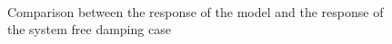 \begin{figure}[!ht]
	\ContinuedFloat
	\centering
		\\
	\caption{Comparison between the response of the model and the response of the 
	system free damping case}
	\label{fig:freedampingcase}
\end{figure}

